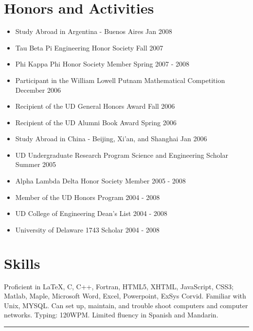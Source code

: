 \documentclass[10pt]{article}
\newenvironment{myitem}{
\begin{itemize}
  \setlength{\itemsep}{1pt}
  \setlength{\parskip}{0pt}
  \setlength{\parsep}{0pt}
}{\end{itemize}}
\begin{document}
\section{Honors and Activities}
\vspace{-0.25cm}
\begin{myitem}
 \item Study Abroad in Argentina - Buenos Aires \hfill Jan 2008
 \item Tau Beta Pi Engineering Honor Society \hfill Fall 2007
 \item Phi Kappa Phi Honor Society Member \hfill Spring 2007 - 2008
 \item Participant in the William Lowell Putnam Mathematical Competition \hfill December 2006
 \item Recipient of the UD General Honors Award \hfill Fall 2006
 \item Recipient of the UD Alumni Book Award \hfill Spring 2006
 \item Study Abroad in China - Beijing, Xi'an, and Shanghai \hfill Jan 2006 %
 \item UD Undergraduate Research Program Science and Engineering Scholar \hfill Summer 2005
 \item Alpha Lambda Delta Honor Society Member \hfill 2005 - 2008 %
 \item Member of the UD Honors Program \hfill 2004 - 2008 %
 \item UD College of Engineering Dean's List \hfill 2004 - 2008  %
 \item University of Delaware 1743 Scholar \hfill 2004 - 2008 %
\end{myitem}
%
\vspace{-.55cm}
\section{Skills}
\vspace{-0.25cm}
Proficient in \LaTeX, C, C++, Fortran, HTML5, XHTML, JavaScript, CSS3; Matlab, Maple, Microsoft Word, Excel, Powerpoint, ExSys Corvid. Familiar with Unix, MYSQL. Can set up, maintain, and trouble shoot computers and computer networks. Typing: 120WPM. Limited fluency in Spanish and Mandarin.
%
\vfill
\hrule
\end{document}
